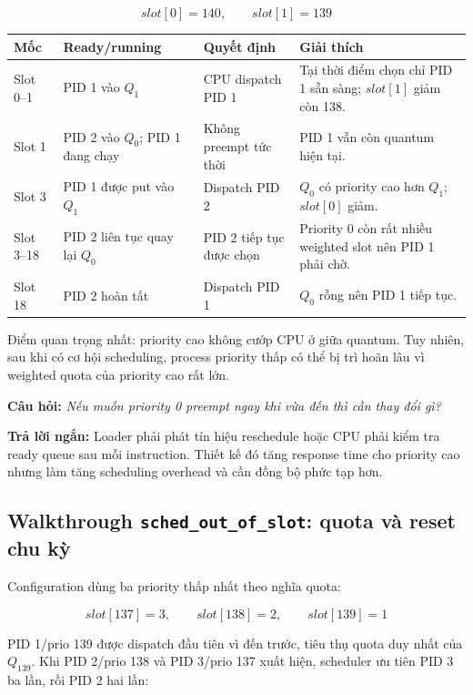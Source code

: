 \documentclass[12pt,a4paper]{article}
\newcommand{\question}[1]{\textbf{\color{bkgold}Câu hỏi:} \textit{#1}}
\newcommand{\answer}{\textbf{\color{bkblue}Trả lời ngắn:} }
\begin{document}
\[
slot[0]=140,\qquad slot[1]=139
\]

\begin{longtable}{|p{2.2cm}|p{3.7cm}|p{3.8cm}|p{4.4cm}|}
\hline
\textbf{Mốc} & \textbf{Ready/running} & \textbf{Quyết định} &
\textbf{Giải thích}\\ \hline
Slot 0--1 & PID 1 vào \(Q_1\) & CPU dispatch PID 1 &
Tại thời điểm chọn chỉ PID 1 sẵn sàng; \(slot[1]\) giảm còn 138.\\ \hline
Slot 1 & PID 2 vào \(Q_0\); PID 1 đang chạy & Không preempt tức thời &
PID 1 vẫn còn quantum hiện tại.\\ \hline
Slot 3 & PID 1 được put vào \(Q_1\) & Dispatch PID 2 &
\(Q_0\) có priority cao hơn \(Q_1\); \(slot[0]\) giảm.\\ \hline
Slot 3--18 & PID 2 liên tục quay lại \(Q_0\) & PID 2 tiếp tục được chọn &
Priority 0 còn rất nhiều weighted slot nên PID 1 phải chờ.\\ \hline
Slot 18 & PID 2 hoàn tất & Dispatch PID 1 & \(Q_0\) rỗng nên PID 1 tiếp tục.\\
\hline
\end{longtable}

Điểm quan trọng nhất: priority cao không cướp CPU ở giữa quantum. Tuy nhiên,
sau khi có cơ hội scheduling, process priority thấp có thể bị trì hoãn lâu vì
weighted quota của priority cao rất lớn.

\question{Nếu muốn priority 0 preempt ngay khi vừa đến thì cần thay đổi gì?}

\answer Loader phải phát tín hiệu reschedule hoặc CPU phải kiểm tra ready queue
sau mỗi instruction. Thiết kế đó tăng response time cho priority cao nhưng làm
tăng scheduling overhead và cần đồng bộ phức tạp hơn.

\subsection{Walkthrough \texttt{sched\_out\_of\_slot}: quota và reset chu kỳ}

Configuration dùng ba priority thấp nhất theo nghĩa quota:

\[
slot[137]=3,\qquad slot[138]=2,\qquad slot[139]=1
\]

PID 1/prio 139 được dispatch đầu tiên vì đến trước, tiêu thụ quota duy nhất của
\(Q_{139}\). Khi PID 2/prio 138 và PID 3/prio 137 xuất hiện, scheduler ưu tiên
PID 3 ba lần, rồi PID 2 hai lần:
\end{document}
